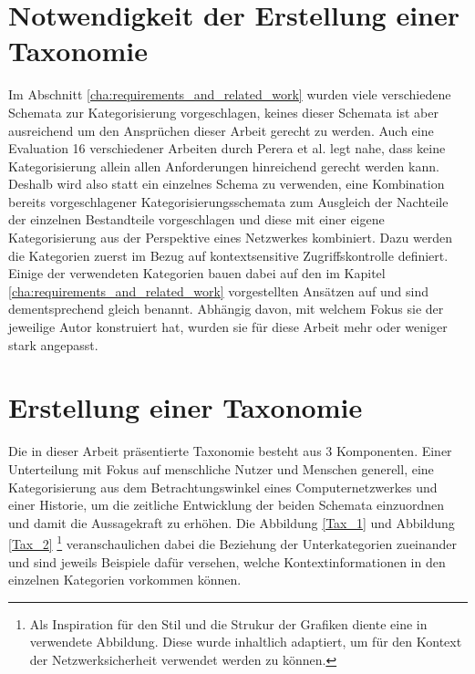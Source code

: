 \section{Notwendigkeit der Erstellung einer Taxonomie }
Im Abschnitt \ref{cha:requirements_and_related_work} wurden viele verschiedene Schemata zur Kategorisierung vorgeschlagen, keines dieser Schemata ist aber ausreichend um den Ansprüchen dieser Arbeit gerecht zu werden. Auch eine Evaluation 16 verschiedener Arbeiten durch Perera et al. \cite{perera_context_2014} legt nahe, dass keine Kategorisierung allein allen Anforderungen hinreichend gerecht werden kann.
Deshalb wird also statt ein einzelnes Schema zu verwenden, eine Kombination bereits vorgeschlagener Kategorisierungsschemata zum Ausgleich der Nachteile der einzelnen Bestandteile vorgeschlagen und diese mit einer eigene Kategorisierung aus der Perspektive eines Netzwerkes kombiniert. Dazu werden die Kategorien zuerst im Bezug auf kontextsensitive Zugriffskontrolle definiert. Einige der verwendeten Kategorien bauen dabei auf den im Kapitel \ref{cha:requirements_and_related_work} vorgestellten Ansätzen auf und sind dementsprechend gleich benannt. Abhängig davon, mit welchem Fokus sie der jeweilige Autor konstruiert hat, wurden sie für diese Arbeit mehr oder weniger stark angepasst.
\section{Erstellung einer Taxonomie}
\label{sec:tax_erstellung}
Die in dieser Arbeit präsentierte Taxonomie besteht aus 3 Komponenten. Einer Unterteilung mit Fokus auf menschliche Nutzer und Menschen generell, eine Kategorisierung aus dem Betrachtungswinkel eines Computernetzwerkes und einer Historie, um die zeitliche Entwicklung der beiden Schemata einzuordnen und damit die Aussagekraft zu erhöhen.
Die Abbildung \ref{Tax_1} und Abbildung \ref{Tax_2} \footnote{Als Inspiration für den Stil und die Strukur der Grafiken diente eine in \cite{perera_context_2014} verwendete Abbildung. Diese wurde inhaltlich adaptiert, um für den Kontext der Netzwerksicherheit verwendet werden zu können.}  veranschaulichen dabei die Beziehung der Unterkategorien zueinander und sind jeweils Beispiele dafür versehen, welche Kontextinformationen in den einzelnen Kategorien vorkommen können. 
